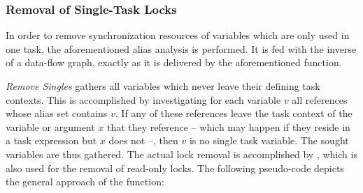 \subsubsection{Removal of Single-Task Locks}
\label{single-task-locks}
In order to remove synchronization resources of variables which are only used in one task, the aforementioned alias analysis is performed. It is fed with the inverse of a data-flow graph, exactly as it is delivered by the aforementioned function. 

\vspace{4mm}

\textit{Remove Singles} gathers all variables which never leave their defining task contexts. This is accomplished by investigating for each variable $v$ all references whose alias set contains $v$. If any of these references leave the task context of the variable or argument $x$ that they reference -- which may happen if they reside in a task expression but $x$ does not --, then $v$ is no single task variable. The sought variables are thus gathered. The actual lock removal is accomplished by , which is also used for the removal of read-only locks. The following pseudo-code depicts the general approach of the function:

\vspace{4mm}

